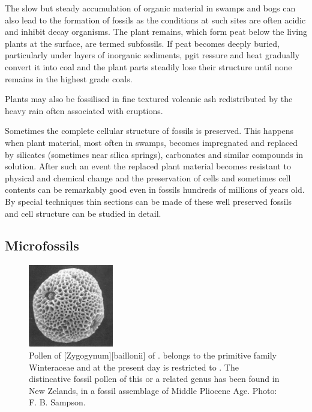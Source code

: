 The slow but steady accumulation of organic material in swamps and bogs can also lead to the formation of fossils as the conditions at such sites are often acidic and inhibit decay organisms.
The plant remains, which form peat below the living plants at the surface, are termed subfossils.
If peat becomes deeply buried, particularly under layers of inorganic sediments, pgit ressure and heat gradually convert it into coal and the plant parts steadily lose their structure until none remains in the highest grade coals.

Plants may also be fossilised in fine textured volcanic ash redistributed by the heavy rain often associated with eruptions.

Sometimes the complete cellular structure of fossils is preserved.
This happens when plant material, most often in swamps, becomes impregnated and replaced by silicates (sometimes near silica springs), carbonates and similar compounds in solution.
After such an event the replaced plant material becomes resistant to physical and chemical change and the preservation of cells and sometimes cell contents can be remarkably good even in fossils hundreds of millions of years old.
By special techniques thin sections can be made of these well preserved fossils and cell structure can be studied in detail.

\subsection{Microfossils}

\begin{figure}
	\includegraphics[width=0.33\textwidth]{graphics/figure122pollen.jpg}
	\centering
	\caption[Pollen of \emph{Zygogynum baillonii} of New Caledonia]{Pollen of [Zygogynum][baillonii] of .  belongs to the primitive family Winteraceae and at the present day is restricted to .
	The distincative fossil pollen of this or a related genus has been found in New Zelands, in a fossil assemblage of Middle Pliocene Age.
	Photo: F. B. Sampson.}%
	\label{fig:122pollen}
\end{figure}

